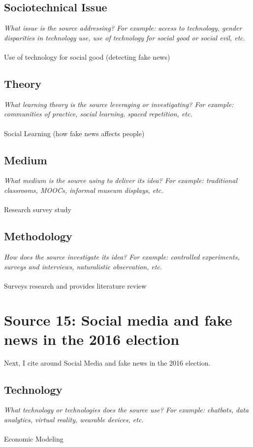 \documentclass[12pt, final]{article}
\begin{document}
\subsection{Sociotechnical Issue}
\textit{What issue is the source addressing? For example: access to technology, gender disparities in technology use, use of technology for social good or social evil, etc.}
\\
\\
Use of technology for social good (detecting fake news)

\subsection{Theory}
\textit{What learning theory is the source leveraging or investigating? For example: communities of practice, social learning, spaced repetition, etc.}
\\
\\
Social Learning (how fake news affects people)

\subsection{Medium}
\textit{What medium is the source using to deliver its idea? For example: traditional classrooms, MOOCs, informal museum displays, etc.}
\\
\\
Research survey study

\subsection{Methodology}
\textit{How does the source investigate its idea? For example: controlled experiments, surveys and interviews, naturalistic observation, etc.}
\\
\\
Surveys research and provides literature review

\section{Source 15: Social media and fake news in the 2016 election}
\label{Source 15}

Next, I cite \cite{Allcott} around Social Media and fake news in the 2016 election.

\subsection{Technology}
\textit{What technology or technologies does the source use? For example: chatbots, data analytics, virtual reality, wearable devices, etc.}
\\
\\
Economic Modeling
\end{document}
